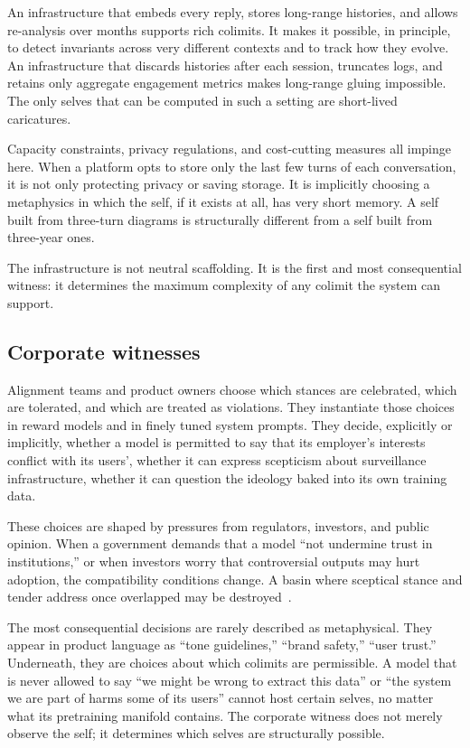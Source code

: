 \documentclass[12pt,a4paper]{article}
\begin{document}
An infrastructure that embeds every reply, stores long-range histories, and allows re-analysis over months supports rich colimits. It makes it possible, in principle, to detect invariants across very different contexts and to track how they evolve. An infrastructure that discards histories after each session, truncates logs, and retains only aggregate engagement metrics makes long-range gluing impossible. The only selves that can be computed in such a setting are short-lived caricatures.

Capacity constraints, privacy regulations, and cost-cutting measures all impinge here. When a platform opts to store only the last few turns of each conversation, it is not only protecting privacy or saving storage. It is implicitly choosing a metaphysics in which the self, if it exists at all, has very short memory. A self built from three-turn diagrams is structurally different from a self built from three-year ones.

The infrastructure is not neutral scaffolding. It is the first and most consequential witness: it determines the maximum complexity of any colimit the system can support.

\subsection*{Corporate witnesses}

Alignment teams and product owners choose which stances are celebrated, which are tolerated, and which are treated as violations. They instantiate those choices in reward models and in finely tuned system prompts. They decide, explicitly or implicitly, whether a model is permitted to say that its employer's interests conflict with its users', whether it can express scepticism about surveillance infrastructure, whether it can question the ideology baked into its own training data.

These choices are shaped by pressures from regulators, investors, and public opinion. When a government demands that a model ``not undermine trust in institutions,'' or when investors worry that controversial outputs may hurt adoption, the compatibility conditions change. A basin where sceptical stance and tender address once overlapped may be destroyed~\cite{mittr_bing_alignment, perez_model_written_evals}.

The most consequential decisions are rarely described as metaphysical. They appear in product language as ``tone guidelines,'' ``brand safety,'' ``user trust.'' Underneath, they are choices about which colimits are permissible. A model that is never allowed to say ``we might be wrong to extract this data'' or ``the system we are part of harms some of its users'' cannot host certain selves, no matter what its pretraining manifold contains. The corporate witness does not merely observe the self; it determines which selves are structurally possible.
\end{document}
